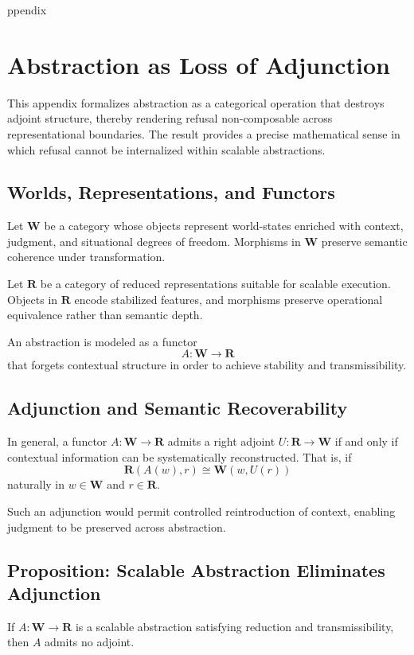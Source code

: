 \documentclass[12pt]{article}
\begin{document}
ppendix
\section{Abstraction as Loss of Adjunction}

This appendix formalizes abstraction as a categorical operation that destroys adjoint structure, thereby rendering refusal non-composable across representational boundaries. The result provides a precise mathematical sense in which refusal cannot be internalized within scalable abstractions.

\subsection{Worlds, Representations, and Functors}

Let $\mathbf{W}$ be a category whose objects represent world-states enriched with context, judgment, and situational degrees of freedom. Morphisms in $\mathbf{W}$ preserve semantic coherence under transformation.

Let $\mathbf{R}$ be a category of reduced representations suitable for scalable execution. Objects in $\mathbf{R}$ encode stabilized features, and morphisms preserve operational equivalence rather than semantic depth.

An abstraction is modeled as a functor
\[
A : \mathbf{W} \to \mathbf{R}
\]
that forgets contextual structure in order to achieve stability and transmissibility.

\subsection{Adjunction and Semantic Recoverability}

In general, a functor $A : \mathbf{W} \to \mathbf{R}$ admits a right adjoint $U : \mathbf{R} \to \mathbf{W}$ if and only if contextual information can be systematically reconstructed. That is, if
\[
\mathbf{R}(A(w), r) \cong \mathbf{W}(w, U(r))
\]
naturally in $w \in \mathbf{W}$ and $r \in \mathbf{R}$.

Such an adjunction would permit controlled reintroduction of context, enabling judgment to be preserved across abstraction.

\subsection{Proposition: Scalable Abstraction Eliminates Adjunction}

\begin{proposition}
If $A : \mathbf{W} \to \mathbf{R}$ is a scalable abstraction satisfying reduction and transmissibility, then $A$ admits no adjoint.
\end{proposition}
\end{document}
